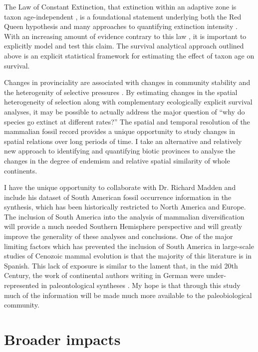 \documentclass[11pt,letterpaper]{article}
\begin{document}
The Law of Constant Extinction, that extinction within an adaptive zone is taxon age-independent \citep{VanValen1973}, is a foundational statement underlying both the Red Queen hypothesis and many approaches to quantifying extinction intensity \citep{Alroy2014a,Foote1996e,Foote1997c,Foote2000,Raup1975,Sepkoski1975}. With an increasing amount of evidence contrary to this law \citep{Drake2014,Raup1975,Sepkoski1975,Finnegan2008}, it is important to explicitly model and test this claim. The survival analytical approach outlined above is an explicit statistical framework for estimating the effect of taxon age on survival.

Changes in provinciality are associated with changes in community stability and the heterogenity of selective pressures \citep{Sidor2013,Vilhena2013}. By estimating changes in the spatial heterogeneity of selection along with complementary ecologically explicit survival analyses, it may be possible to actually address the major question of ``why do species go extinct at different rates?'' The spatial and temporal resolution of the mammalian fossil record provides a unique opportunity to study changes in spatial relations over long periods of time. I take an alternative and relatively new approach to identifying and quantifying biotic provinces \citep{Sidor2013,Vilhena2013b,Vilhena2013} to analyse the changes in the degree of endemism and relative spatial similarity of whole continents. 

I have the unique opportunity to collaborate with Dr. Richard Madden and include his dataset of South American fossil occurrence information in the synthesis, which has been historically restricted to North America and Europe. The inclusion of South America into the analysis of mammalian diversification will provide a much needed Southern Hemisphere perspective and will greatly improve the generality of these analyses and conclusions. One of the major limiting factors which has prevented the inclusion of South America in large-scale studies of Cenozoic mammal evolution is that the majority of this literature is in Spanish. This lack of exposure is similar to the lament that, in the mid 20th Century, the work of continental authors writing in German were under-represented in paleontological syntheses \citep{Gould1979a}. My hope is that through this study much of the information will be made much more available to the paleobiological community.


\section{Broader impacts}
\end{document}
